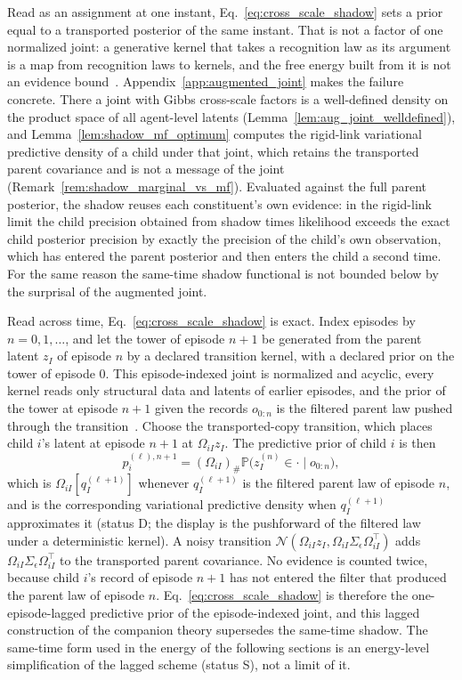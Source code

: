 \documentclass[11pt]{article}
\begin{document}
Read as an assignment at one instant, Eq.~\eqref{eq:cross_scale_shadow} sets a prior equal to a transported posterior of the same instant. That is not a factor of one normalized joint: a generative kernel that takes a recognition law as its argument is a map from recognition laws to kernels, and the free energy built from it is not an evidence bound~\cite[Chs.~4 and 12]{DennisGaugeVFE2026}. Appendix~\ref{app:augmented_joint} makes the failure concrete. There a joint with Gibbs cross-scale factors is a well-defined density on the product space of all agent-level latents (Lemma~\ref{lem:aug_joint_welldefined}), and Lemma~\ref{lem:shadow_mf_optimum} computes the rigid-link variational predictive density of a child under that joint, which retains the transported parent covariance and is not a message of the joint (Remark~\ref{rem:shadow_marginal_vs_mf}). Evaluated against the full parent posterior, the shadow reuses each constituent's own evidence: in the rigid-link limit the child precision obtained from shadow times likelihood exceeds the exact child posterior precision by exactly the precision of the child's own observation, which has entered the parent posterior and then enters the child a second time. For the same reason the same-time shadow functional is not bounded below by the surprisal of the augmented joint.

Read across time, Eq.~\eqref{eq:cross_scale_shadow} is exact. Index episodes by $n = 0, 1, \ldots$, and let the tower of episode $n+1$ be generated from the parent latent $z_I$ of episode $n$ by a declared transition kernel, with a declared prior on the tower of episode $0$. This episode-indexed joint is normalized and acyclic, every kernel reads only structural data and latents of earlier episodes, and the prior of the tower at episode $n+1$ given the records $o_{0:n}$ is the filtered parent law pushed through the transition~\cite[Ch.~12, the delayed-feedback proposition]{DennisGaugeVFE2026}. Choose the transported-copy transition, which places child $i$'s latent at episode $n+1$ at $\Omega_{iI} z_I$. The predictive prior of child $i$ is then
\begin{equation*}
p_i^{(\ell), n+1} = (\Omega_{iI})_{\#} \mathbb{P}\big(z_I^{(n)} \in \cdot \mid o_{0:n}\big),
\end{equation*}
which is $\Omega_{iI}[q_I^{(\ell+1)}]$ whenever $q_I^{(\ell+1)}$ is the filtered parent law of episode $n$, and is the corresponding variational predictive density when $q_I^{(\ell+1)}$ approximates it (status D; the display is the pushforward of the filtered law under a deterministic kernel). A noisy transition $\mathcal{N}(\Omega_{iI} z_I, \Omega_{iI} \Sigma_\epsilon \Omega_{iI}^\top)$ adds $\Omega_{iI}\Sigma_\epsilon\Omega_{iI}^\top$ to the transported parent covariance. No evidence is counted twice, because child $i$'s record of episode $n+1$ has not entered the filter that produced the parent law of episode $n$. Eq.~\eqref{eq:cross_scale_shadow} is therefore the one-episode-lagged predictive prior of the episode-indexed joint, and this lagged construction of the companion theory supersedes the same-time shadow. The same-time form used in the energy of the following sections is an energy-level simplification of the lagged scheme (status S), not a limit of it.
\end{document}
